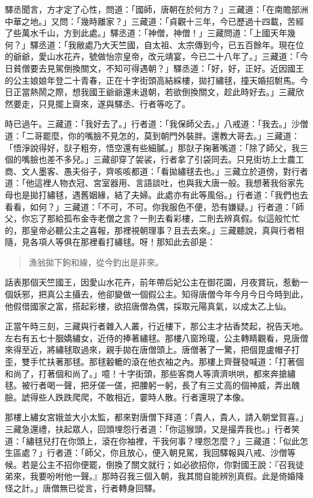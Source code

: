 驛丞聞言，方才定了心性，問道：「國師，唐朝在於何方？」三藏道：「在南贍部洲中華之地。」又問：「幾時離家？」三藏道：「貞觀十三年，今已歷過十四載，苦經了些萬水千山，方到此處。」驛丞道：「神僧，神僧！」三藏問道：「上國天年幾何？」驛丞道：「我敝處乃大天竺國，自太祖、太宗傳到今，已五百餘年。現在位的爺爺，愛山水花卉，號做怡宗皇帝，改元靖宴，今已二十八年了。」三藏道：「今日貧僧要去見駕倒換關文，不知可得遇朝？」驛丞道：「好，好，正好。近因國王的公主娘娘年登二十青春，正在十字街頭高結綵樓，拋打繡毬，撞天婚招駙馬。今日正當熱鬧之際，想我國王爺爺還未退朝，若欲倒換關文，趁此時好去。」三藏欣然要走，只見擺上齋來，遂與驛丞、行者等吃了。

時已過午。三藏道：「我好去了。」行者道：「我保師父去。」八戒道：「我去。」沙僧道：「二哥罷麼，你的嘴臉不見怎的，莫到朝門外裝胖。還教大哥去。」三藏道：「悟淨說得好，獃子粗夯，悟空還有些細膩。」那獃子掬著嘴道：「除了師父，我三個的嘴臉也差不多兒。」三藏卻穿了袈裟，行者拿了引袋同去。只見街坊上士農工商、文人墨客、愚夫俗子，齊咳咳都道：「看拋繡毬去也。」三藏立於道傍，對行者道：「他這裡人物衣冠、宮室器用、言語談吐，也與我大唐一般。我想著我俗家先母也是拋打繡毬，遇舊姻緣，結了夫婦。此處亦有此等風俗。」行者道：「我們也去看看，如何？」三藏道：「不可，不可。你我服色不便，恐有嫌疑。」行者道：「師父，你忘了那給孤布金寺老僧之言？一則去看彩樓，二則去辨真假。似這般忙忙的，那皇帝必聽公主之喜報，那裡視朝理事？且去去來。」三藏聽說，真與行者相隨，見各項人等俱在那裡看打繡毬。呀！那知此去卻是：
\begin{quote}
漁翁拋下鉤和線，從今釣出是非來。
\end{quote}

話表那個天竺國王，因愛山水花卉，前年帶后妃公主在御花園，月夜賞玩，惹動一個妖邪，把真公主攝去，他卻變做一個假公主。知得唐僧今年今月今日今時到此，他假借國家之富，搭起彩樓，欲招唐僧為偶，採取元陽真氣，以成太乙上仙。

正當午時三刻，三藏與行者雜入人叢，行近樓下，那公主才拈香焚起，祝告天地。左右有五七十胭嬌繡女，近侍的捧著繡毬。那樓八窗玲瓏，公主轉睛觀看，見唐僧來得至近，將繡毬取過來，親手拋在唐僧頭上。唐僧著了一驚，把個毘盧帽子打歪，雙手忙扶著那毬。那毬轂轆的滾在他衣袖之內。那樓上齊聲發喊道：「打著個和尚了，打著個和尚了。」噫！十字街頭，那些客商人等濟濟哄哄，都來奔搶繡毬。被行者喝一聲，把牙傞一傞，把腰躬一躬，長了有三丈高的個神威，弄出醜臉。諕得些人跌跌爬爬，不敢相近，霎時人散。行者還現了本像。

那樓上繡女宮娥並大小太監，都來對唐僧下拜道：「貴人，貴人，請入朝堂賀喜。」三藏急還禮，扶起眾人，回頭埋怨行者道：「你這猴頭，又是撮弄我也。」行者笑道：「繡毬兒打在你頭上，滾在你袖裡，干我何事？埋怨怎麼？」三藏道：「似此怎生區處？」行者道：「師父，你且放心，便入朝見駕，我回驛報與八戒、沙僧等候。若是公主不招你便罷，倒換了關文就行；如必欲招你，你對國王說：『召我徒弟來，我要吩咐他一聲。』那時召我三個入朝，我其間自能辨別真假。此是倚婚降怪之計。」唐僧無已從言，行者轉身回驛。


